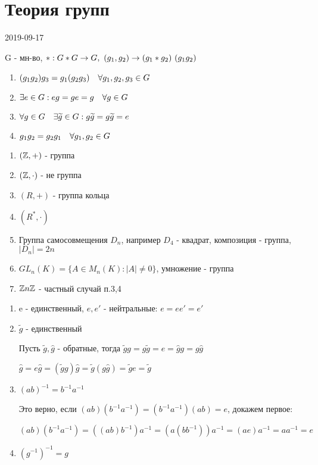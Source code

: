 \documentclass[main]{subfiles}
\begin{document}
  \section{Теория групп}
  2019-09-17
  \begin{definition}[группа]
      G - мн-во, $*:G*G \rightarrow G,\ (g_1, g_2) \rightarrow (g_1*g_2)\ (g_1g_2)$
      \begin{enumerate}
      	\item $(g_1g_2)g_3 = g_1(g_2g_3) \quad \forall g_1, g_2, g_3 \in G$
      	\item $\exists e \in G : eg = ge = g \quad \forall g \in G$
      	\item $\forall g \in G \quad \exists \widetilde{g} \in G : g\widetilde{g} = g \widetilde{g} = e$
      	\item $g_1g_2 = g_2g_1 \quad \forall g_1, g_2 \in G$
  	\end{enumerate}
  \end{definition}

  \begin{examples}
      \begin{enumerate}
          \item $(\mathbb{Z},+)$ - группа
          \item $(\mathbb{Z}, \cdot)$ - не группа
          \item $(R, +)$ - группа кольца
          \item $(R^*, \cdot)$
          \item Группа самосовмещения $D_n$, например $D_4$ - квадрат, композиция - группа, $|D_n|=2n$
          \item $GL_n(K) = \{A \in M_n(K) : |A| \neq 0\}$, умножение - группа
          \item $\mathbb{Z} n \mathbb{Z}$ - частный случай п.3,4
      \end{enumerate}
  \end{examples}

  \begin{theorem}
      \begin{enumerate}
          \item e - единственный, $e,e'$ - нейтральные: $e=e e'=e'$
          \item $\widetilde{g}$ - единственный

          Пусть $\widetilde{g},\hat{g}$ - обратные, тогда $\widetilde{g}g = g\widetilde{g} = e = \hat{g}g = g\hat{g}$

          $\hat{g}=e \hat{g}=(\widetilde{g}g)\hat{g}=\widetilde{g}(g\hat{g})=\widetilde{g}e=\widetilde{g}$
          \item $(a b)^{-1}=b^{-1}a^{-1}$

          Это верно, если $(ab)(b^{-1}a^{-1})=(b^{-1}a^{-1})(ab)=e$, докажем первое:

          $(ab)(b^{-1}a^{-1})=((ab)b^{-1})a^{-1}=(a(bb^{-1}))a^{-1}=(ae)a^{-1}=a a^{-1}=e$
          \item $(g^{-1})^{-1}=g$
      \end{enumerate}
  \end{theorem}
\end{document}
